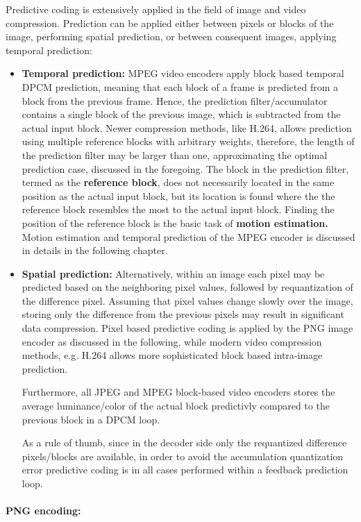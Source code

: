 Predictive coding is extensively applied in the field of image and video compression.
Prediction can be applied either between pixels or blocks of the image, performing spatial prediction, or between consequent images, applying temporal prediction:
\begin{itemize}
\item \textbf{Temporal prediction:} MPEG video encoders apply block based temporal DPCM prediction, meaning that each block of a frame is predicted from a block from the previous frame.
Hence, the prediction filter/accumulator contains a single block of the previous image, which is subtracted from the actual input block.
Newer compression methods, like H.264, allows prediction using multiple reference blocks with arbitrary weights, therefore, the length of the prediction filter may be larger than one, approximating the optimal prediction case, discussed in the foregoing.
The block in the prediction filter, termed as the \textbf{reference block}, does not necessarily located in the same position as the actual input block, but its location is found where the the reference block resembles the most to the actual input block.
Finding the position of the reference block is the basic task of \textbf{motion estimation.}
Motion estimation and temporal prediction of the MPEG encoder is discussed in details in the following chapter.
%
\item \textbf{Spatial prediction:} Alternatively, within an image each pixel may be predicted based on the neighboring pixel values, followed by requantization of the difference pixel.
Assuming that pixel values change slowly over the image, storing only the difference from the previous pixels may result in significant data compression.
Pixel based predictive coding is applied by the PNG image encoder as discussed in the following, while modern video compression methods, e.g. H.264 allows more sophisticated block based intra-image prediction.

Furthermore, all JPEG and MPEG block-based video encoders stores the average luminance/color of the actual block predictivly compared to the previous block in a DPCM loop.

As a rule of thumb, since in the decoder side only the requantized difference pixels/blocks are available, in order to avoid the accumulation quantization error predictive coding is in all cases performed within a feedback prediction loop.
\end{itemize}

\paragraph*{PNG encoding:\\}

